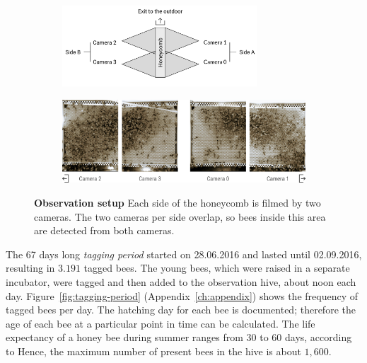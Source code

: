 \begin{figure}
    \centering
    \begin{subfigure}[htb]{\textwidth}
	\centering
	\includegraphics[width=0.8\textwidth]{Figures/setupCams}
    \end{subfigure}
    \begin{subfigure}[b]{\textwidth}
	\centering
	\includegraphics[width=1.0\textwidth]{Figures/beesClose}
	\vspace{5mm}
    \end{subfigure}
 	\caption[Observation setup]{\textbf{Observation setup} Each side of the honeycomb is filmed by two cameras. The two cameras per side overlap, so bees inside this area are detected from both cameras.}
 	\label{fig:obssetup}
\end{figure}

The 67 days long \emph{tagging period} started on 28.06.2016 and lasted until 02.09.2016, resulting in $3.191$ tagged bees. The young bees, which were raised in a separate incubator, were tagged and then added to the observation hive, about noon each day.
Figure~\ref{fig:tagging-period} (Appendix~\ref{ch:appendix}) shows the frequency of tagged bees per day. The hatching day for each bee is documented; therefore the age of each bee at a particular point in time can be calculated.
The life expectancy of a honey bee during summer ranges from 30 to 60 days, according to \textcite[p. 27]{menzel2016intelligenz}
Hence, the maximum number of present bees in the hive is about $1,600$.

